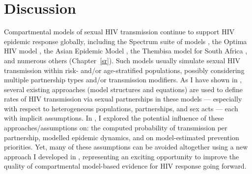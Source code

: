 \section{Discussion}\label{foi.disc}
Compartmental models of sexual HIV transmission continue to support HIV epidemic response globally,
including the Spectrum suite of models \cite{Stover2021,Spectrum2022},
the Optima HIV model \cite{Kerr2015,Optima2021},
the Asian Epidemic Model \cite{Brown2004},
the Thembisa model for South Africa \cite{Johnson2006,Johnson2016,Johnson2022},
and numerous others (\eg Chapter~\ref{sr}).
Such models usually simulate sexual HIV transmission within risk- and/or age-stratified populations,
possibly considering multiple partnership types and/or transmission modifiers.
As I have shown in ,
several existing approaches (model structures and equations)
are used to define rates of HIV transmission via sexual partnerships in these models
--- especially with respect to heterogeneous populations, partnerships, and sex acts ---
each with implicit assumptions.
In , I explored the potential influence of these approaches/assumptions on:
the computed probability of transmission per partnership,
modelled epidemic dynamics, and on model-estimated prevention priorities.
Yet, many of these assumptions can be avoided altogether
using a new approach I developed in ,
representing an exciting opportunity to improve the quality of
compartmental model-based evidence for HIV response going forward.
